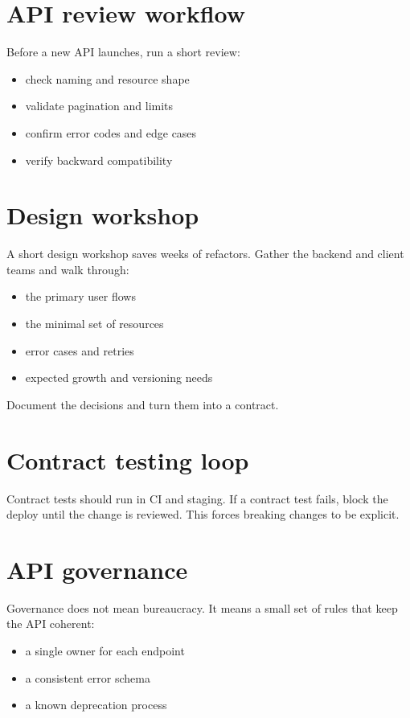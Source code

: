 \section{API review workflow}
Before a new API launches, run a short review:
\begin{itemize}[nosep]
  \item check naming and resource shape
  \item validate pagination and limits
  \item confirm error codes and edge cases
  \item verify backward compatibility
\end{itemize}

\section{Design workshop}
A short design workshop saves weeks of refactors.
Gather the backend and client teams and walk through:
\begin{itemize}[nosep]
  \item the primary user flows
  \item the minimal set of resources
  \item error cases and retries
  \item expected growth and versioning needs
\end{itemize}

Document the decisions and turn them into a contract.

\section{Contract testing loop}
Contract tests should run in CI and staging.
If a contract test fails, block the deploy until the change is reviewed.
This forces breaking changes to be explicit.

\section{API governance}
Governance does not mean bureaucracy.
It means a small set of rules that keep the API coherent:
\begin{itemize}[nosep]
  \item a single owner for each endpoint
  \item a consistent error schema
  \item a known deprecation process
\end{itemize}

